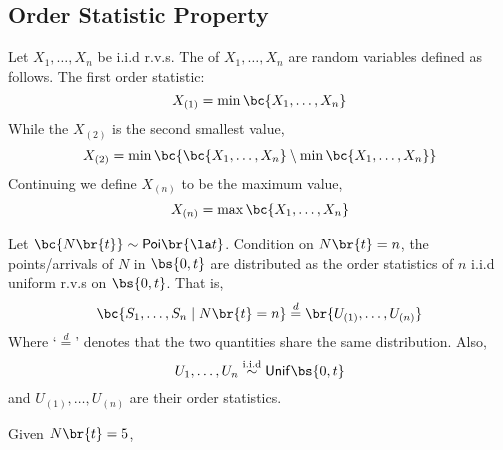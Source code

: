 \documentclass{article}
\newcommand{\Poi}{\mathsf{Poi}}
\newcommand{\Unif}{\mathsf{Unif}}
\begin{document}
    \subsection{Order Statistic Property}

    Let $X_1, \ldots, X_n$ be i.i.d r.v.s. The  of $X_1, \ldots, X_n$ are random variables defined as follows. The first order statistic:
    \[ X_{(1)} = \min\bc{X_1, \ldots, X_n} \]
    While the $X_{(2)}$ is the second smallest value,
    \[ X_{(2)} = \min\bc{\bc{X_1, \ldots, X_n} \setminus \min\bc{{X_1, \ldots, X_n}}} \]
    Continuing we define $X_{(n)}$ to be the maximum value,
    \[ X_{(n)} = \max\bc{X_1, \ldots, X_n} \]
    \begin{theorem}
        Let $\bc{N\br{t}} \sim \Poi\br{\la t}$. Condition on $N\br{t} = n$, the points/arrivals of $N$ in $\bs{0, t}$ are distributed as the order statistics of $n$ i.i.d uniform r.v.s on $\bs{0, t}$. That is,
        \[ \bc{S_1, \ldots, S_n \mid N\br{t} = n} \stackrel{d}{=} \br{U_{(1)}, \ldots, U_{(n)}} \]
        Where `$\stackrel{d}{=}$' denotes that the two quantities share the same distribution. Also,
        \[ U_{1}, \ldots, U_{n} \stackrel{\text{i.i.d}}{\sim} \Unif\bs{0,t} \]
        and $U_{(1)}, \ldots, U_{(n)}$ are their order statistics.
    \end{theorem}

    \begin{example}
        Given $N\br{t} = 5$,
        \begin{center}
        \end{center}
    \end{example}
\end{document}
